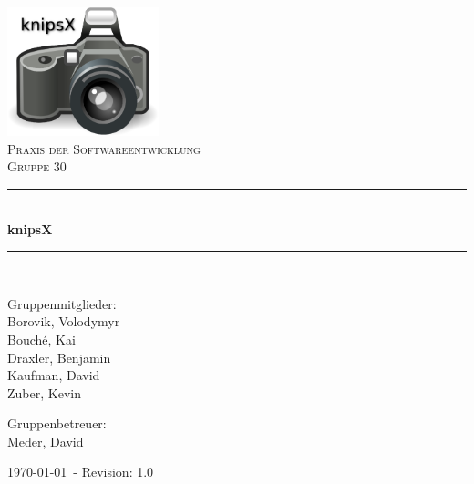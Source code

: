 
\newcommand{\HRule}{\rule{\linewidth}{0.5mm}}

\begin{titlepage}
 
\begin{center}
 
 
\includegraphics[width=0.33\textwidth]{images/cover.eps}\\[3cm]
 
\textsc{\LARGE Praxis der Softwareentwicklung}\\[1.5cm]
 
\textsc{\Large Gruppe 30 }\\[0.5cm]
 
 
\HRule \\[0.4cm]
{ \huge \bfseries knipsX}\\[0.4cm]
 
\HRule \\[1.5cm]
 
\begin{minipage}{0.4\textwidth}
\begin{flushleft} \large

Gruppenmitglieder: \\
Borovik, Volodymyr \\
Bouché, Kai \\
Draxler, Benjamin \\
Kaufman, David \\
Zuber, Kevin

\end{flushleft}
\end{minipage}
\begin{minipage}{0.4\textwidth}
\begin{flushright} \large
Gruppenbetreuer: \\
Meder, David
\end{flushright}
\end{minipage} 
\vfill

{\large \today ~- Revision: 1.0}
 
\end{center}
\end{titlepage}